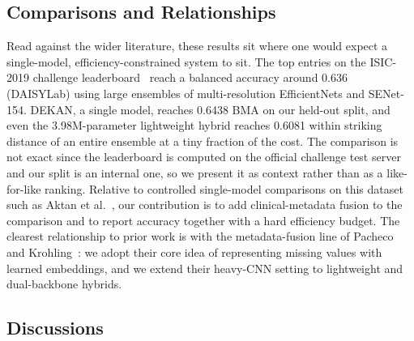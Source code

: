 \begin{table}[!t]
\centering
\caption{DEKAN ablation: effect of clinical metadata and the KAN vs.\ linear
classifier head (TTA BMA). The single-backbone variants were not trained, so
the dual-backbone fusion gain cannot yet be quantified.}
\label{tab:abldekan}
\end{table}

\subsection{Comparisons and Relationships}

Read against the wider literature, these results sit where one would expect a
single-model, efficiency-constrained system to sit. The top entries on the
ISIC-2019 challenge leaderboard~\cite{isic2019leaderboard} reach a balanced
accuracy around 0.636 (DAISYLab) using large ensembles of multi-resolution
EfficientNets and SENet-154. DEKAN, a single model, reaches 0.6438 BMA on our
held-out split, and even the 3.98M-parameter lightweight hybrid reaches 0.6081
within striking distance of an entire ensemble at a tiny fraction of the cost.
The comparison is not exact since the leaderboard is computed on the official
challenge test server and our split is an internal one, so we present it as
context rather than as a like-for-like ranking. Relative to controlled
single-model comparisons on this dataset such as Aktan et
al.~\cite{aktan2025comparison}, our contribution is to add clinical-metadata
fusion to the comparison and to report accuracy together with a hard efficiency
budget. The clearest relationship to prior work is with the metadata-fusion line
of Pacheco and Krohling~\cite{pacheco2020impact,pacheco2021attention}: we adopt
their core idea of representing missing values with learned embeddings, and we
extend their heavy-CNN setting to lightweight and dual-backbone hybrids.

\subsection{Discussions}

